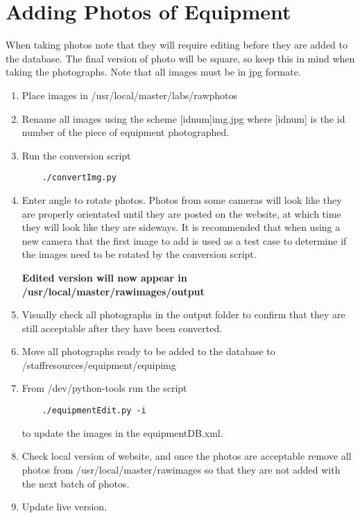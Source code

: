 \documentclass[justified]{LabArx3_5_1}
\begin{document}


\section{Adding Photos of Equipment}\label{sec:invPhoto}

When taking photos note that they will require editing before they are added to the database. The final version of photo will be square, so keep this in mind when taking the photographs. Note that all images must be in jpg formate.

\begin{enumerate}
\item Place images in /usr/local/master/labs/rawphotos
\item Rename all images using the scheme [idnum]img.jpg where [idnum] is the id number of the piece of equipment photographed.
\item Run the conversion script

	\begin{lstlisting}
	./convertImg.py       
	\end{lstlisting}

\item Enter angle to rotate photos. Photos from some cameras will look like they are properly orientated until they are posted on the website, at which time they will look like they are sideways. It is recommended that when using a new camera that the first image to add is used as a test case to determine if the images need to be rotated by the conversion script.

{\bf Edited version will now appear in /usr/local/master/rawimages/output}

\item Visually check all photographs in the output folder to confirm that they are still acceptable after they have been converted.

\item Move all photographs ready to be added to the database to /staffresources/equipment/equipimg
\item From /dev/python-tools run the script

	\begin{lstlisting}
	./equipmentEdit.py -i
	\end{lstlisting}

to update the images in the equipmentDB.xml.

\item Check local version of website, and once the photos are acceptable remove all photos from /usr/local/master/rawimages so that they are not added with the next batch of photos.

\item Update live version.
\end{enumerate}
\end{document}
